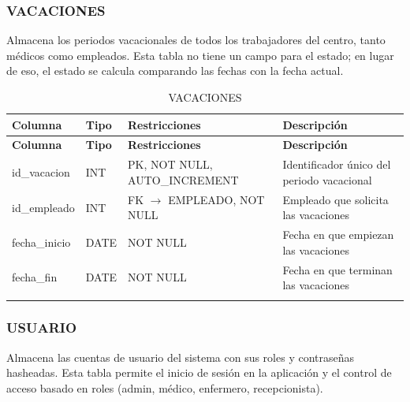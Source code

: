 \documentclass[12pt,a4paper]{article}
\begin{document}
\subsubsection{VACACIONES}
Almacena los periodos vacacionales de todos los trabajadores del centro, tanto m\'edicos como empleados. Esta tabla no tiene un campo para el estado; en lugar de eso, el estado se calcula comparando las fechas con la fecha actual.

{\small\begin{longtable}{|p{2.3cm}|p{3.3cm}|p{4.2cm}|p{4.2cm}|}
\hline
\textbf{Columna} & \textbf{Tipo} & \textbf{Restricciones} & \textbf{Descripci\'on} \\ \hline
\endfirsthead
\hline
\textbf{Columna} & \textbf{Tipo} & \textbf{Restricciones} & \textbf{Descripci\'on} \\ \hline
\endhead
id\_vacacion & INT & PK, NOT NULL, AUTO\_INCREMENT & Identificador \'unico del periodo vacacional \\ \hline
id\_empleado & INT & FK $\rightarrow$ EMPLEADO, NOT NULL & Empleado que solicita las vacaciones \\ \hline
fecha\_inicio & DATE & NOT NULL & Fecha en que empiezan las vacaciones \\ \hline
fecha\_fin & DATE & NOT NULL & Fecha en que terminan las vacaciones \\ \hline
\caption{VACACIONES}
\end{longtable}}

\subsubsection{USUARIO}
Almacena las cuentas de usuario del sistema con sus roles y contrase\~nas hasheadas. Esta tabla permite el inicio de sesi\'on en la aplicaci\'on y el control de acceso basado en roles (admin, m\'edico, enfermero, recepcionista).
\end{document}
